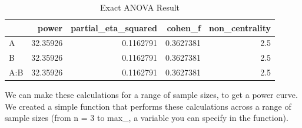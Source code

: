 \documentclass[]{book}
\newenvironment{Shaded}{\begin{snugshade}}{\end{snugshade}}
\newcommand{\CommentTok}[1]{\textcolor[rgb]{0.56,0.35,0.01}{\textit{#1}}}
\newcommand{\DataTypeTok}[1]{\textcolor[rgb]{0.13,0.29,0.53}{#1}}
\newcommand{\DecValTok}[1]{\textcolor[rgb]{0.00,0.00,0.81}{#1}}
\newcommand{\FloatTok}[1]{\textcolor[rgb]{0.00,0.00,0.81}{#1}}
\newcommand{\KeywordTok}[1]{\textcolor[rgb]{0.13,0.29,0.53}{\textbf{#1}}}
\newcommand{\NormalTok}[1]{#1}
\newcommand{\OtherTok}[1]{\textcolor[rgb]{0.56,0.35,0.01}{#1}}
\newcommand{\StringTok}[1]{\textcolor[rgb]{0.31,0.60,0.02}{#1}}
\begin{document}
\begin{Shaded}
\end{Shaded}

\begin{table}[!h]

\caption{\label{tab:unnamed-chunk-317}Exact ANOVA Result}
\centering
\begin{tabular}{l|r|r|r|r}
\hline
  & power & partial\_eta\_squared & cohen\_f & non\_centrality\\
\hline
A & 32.35926 & 0.1162791 & 0.3627381 & 2.5\\
\hline
B & 32.35926 & 0.1162791 & 0.3627381 & 2.5\\
\hline
A:B & 32.35926 & 0.1162791 & 0.3627381 & 2.5\\
\hline
\end{tabular}
\end{table}
\pagebreak

We can make these calculations for a range of sample sizes, to get a power curve. We created a simple function that performs these calculations across a range of sample sizes (from n = 3 to max\_, a variable you can specify in the function).
\end{document}
